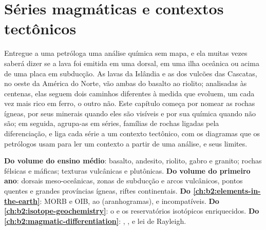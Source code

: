 \chapter{Séries magmáticas e contextos tectônicos}\label{ch:b2:magmatic-series}

Entregue a uma petróloga uma análise química sem mapa, e ela muitas vezes saberá dizer se a
lava foi emitida em uma dorsal, em uma ilha oceânica ou acima de uma placa em subducção. As lavas
da Islândia e as dos vulcões das Cascatas, no oeste da América do Norte, vão ambas
do basalto ao riolito; analisadas às centenas, elas seguem dois caminhos diferentes à medida
que evoluem, um cada vez mais rico em ferro, o outro não. Este capítulo começa por
nomear as rochas ígneas, por seus minerais quando eles são visíveis e por sua
química quando não são; em seguida, agrupa-as em séries, famílias de rochas
ligadas pela diferenciação, e liga cada série a um contexto tectônico, com os
diagramas que os petrólogos usam para ler um contexto a partir de uma análise, e seus limites.

\begin{recall}
\textbf{Do volume do ensino médio}: basalto, andesito, riolito, gabro e granito;
rochas félsicas e máficas; texturas vulcânicas e plutônicas. \textbf{Do volume do primeiro
ano}: dorsais meso-oceânicas, zonas de subducção e arcos vulcânicos, pontos quentes e grandes
províncias ígneas, riftes continentais. \textbf{Do \cref{ch:b2:elements-in-the-earth}}:
MORB e OIB,  ao  (aranhogramas),  e
incompatíveis. \textbf{Do \cref{ch:b2:isotope-geochemistry}}: o  e os reservatórios isotópicos enriquecidos. \textbf{Do
\cref{ch:b2:magmatic-differentiation}}: , ,  e lei de Rayleigh.
\end{recall}

